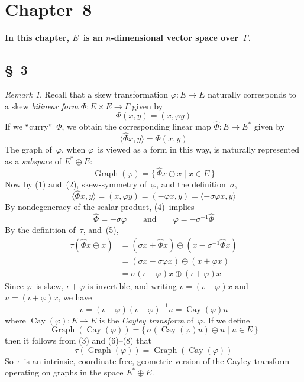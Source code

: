 \documentclass[letterpaper,12pt]{article}
\DeclareMathOperator{\Graph}{Graph}
\DeclareMathOperator{\Cayley}{Cay}
\newcommand{\dsum}{\oplus}
\newcommand{\sprod}[2]{\langle#1,#2\rangle}
\newcommand{\iprod}[2]{(#1,#2)}
\newcommand{\curry}{\widehat}
\theoremstyle{definition}
\theoremstyle{remark}
\newtheorem*{rmk}{Remark}
\begin{document}
\newpage
\section*{Chapter~8}
{\boldmath\textbf{In this chapter, \(E\)~is an \(n\)-dimensional vector space over~\(\Gamma\).}}

\subsection*{\S~3}
\begin{rmk}
Recall that a skew transformation \(\varphi:E\to E\) naturally corresponds to a skew \emph{bilinear form} \(\Phi:E\times E\to\Gamma\) given by
\[\Phi(x,y)=\iprod{x}{\varphi y}\tag{1}\]
If we ``curry''~\(\Phi\), we obtain the corresponding linear map \(\curry{\Phi}:E\to E^*\) given by
\[\sprod{\curry{\Phi}x}{y}=\Phi(x,y)\tag{2}\]
The graph of~\(\varphi\), when \(\varphi\)~is viewed as a form in this way, is naturally represented as a \emph{subspace} of \(E^*\dsum E\):
\[\Graph(\varphi)=\{\,\curry{\Phi}x\dsum x\mid x\in E\,\}\tag{3}\]
Now by (1) and~(2), skew-symmetry of~\(\varphi\), and the definition~\(\sigma\),
\[\sprod{\curry{\Phi}x}{y}=\iprod{x}{\varphi y}=\iprod{-\varphi x}{y}=\sprod{-\sigma\varphi x}{y}\tag{4}\]
By nondegeneracy of the scalar product, (4)~implies
\[\curry{\Phi}=-\sigma\varphi\qquad\text{and}\qquad\varphi=-\sigma^{-1}\curry{\Phi}\tag{5}\]
By the definition of~\(\tau\), and~(5),
\begin{align*}
\tau(\curry{\Phi}x\dsum x)&=(\sigma x+\curry{\Phi}x)\dsum(x-\sigma^{-1}\curry{\Phi}x)\\
	&=(\sigma x-\sigma\varphi x)\dsum(x+\varphi x)\\
	&=\sigma(\iota-\varphi)x\dsum(\iota+\varphi)x\tag{6}
\end{align*}
Since \(\varphi\)~is skew, \(\iota+\varphi\) is invertible, and writing \(v=(\iota-\varphi)x\) and \(u=(\iota+\varphi)x\), we have
\[v=(\iota-\varphi)(\iota+\varphi)^{-1}u=\Cayley(\varphi)u\tag{7}\]
where \(\Cayley(\varphi):E\to E\) is the \emph{Cayley transform} of~\(\varphi\). If we define
\[\Graph(\Cayley(\varphi))=\{\,\sigma(\Cayley(\varphi)u)\dsum u\mid u\in E\,\}\tag{8}\]
then it follows from (3) and (6)--(8) that
\[\boxed{\tau(\Graph(\varphi))=\Graph(\Cayley(\varphi))}\tag{9}\]
So \(\tau\)~is an intrinsic, coordinate-free, geometric version of the Cayley transform operating on graphs in the space \(E^*\dsum E\).
\end{rmk}
\end{document}
